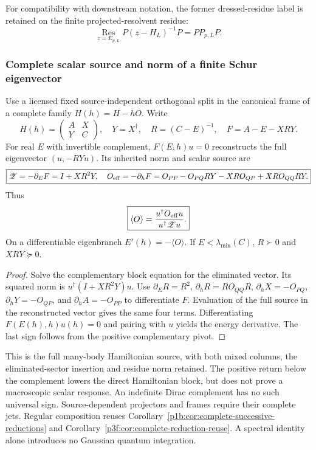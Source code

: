 \documentclass[12pt,a4paper]{article}
\begin{document}
For compatibility with downstream notation, the former dressed-residue label
is retained on the finite projected-resolvent residue:
\begin{equation}
\label{p10:eq:schur-dressed-residue-normalization}
\operatorname*{Res}_{z=E_{p,L}}
P(z-H_L)^{-1}P=P P_{p,L}P .
\end{equation}



\subsubsection{Complete scalar source and norm of a finite Schur eigenvector}
\label{p10:sec:complete-schur-scalar-source}
\begin{theorem}
\label{p10:thm:complete-schur-scalar-source}
Use a licensed fixed source-independent orthogonal split in the
canonical frame of a complete family $H(h)=H-hO$. Write
\[
 H(h)=\begin{pmatrix}A&X\\Y&C\end{pmatrix},\quad Y=X^\dagger,\quad
 R=(C-E)^{-1},\quad F=A-E-XRY.
\]
For real $E$ with invertible complement, $F(E,h)u=0$ reconstructs
the full eigenvector $(u,-RYu)$. Its inherited norm and scalar source are
\[
 \boxed{\mathscr Z=-\partial_EF=I+XR^2Y,\quad
 O_{\rm eff}=-\partial_hF
 =O_{PP}-O_{PQ}RY-XRO_{QP}+XRO_{QQ}RY.}
\]
Thus
\[
 \boxed{\langle O\rangle
 =\frac{u^\dagger O_{\rm eff}u}{u^\dagger\mathscr Zu}.}
\]
On a differentiable eigenbranch $E'(h)=-\langle O\rangle$.
If $E<\lambda_{\min}(C)$, $R\succ0$ and $XRY\succeq0$.
\end{theorem}
\begin{proof}
Solve the complementary block equation for the eliminated vector.
Its squared norm is $u^\dagger(I+XR^2Y)u$.
Use $\partial_ER=R^2$, $\partial_hR=RO_{QQ}R$,
$\partial_hX=-O_{PQ}$, $\partial_hY=-O_{QP}$, and
$\partial_hA=-O_{PP}$ to differentiate $F$.
Evaluation of the full source in the reconstructed vector gives
the same four terms. Differentiating $F(E(h),h)u(h)=0$ and
pairing with $u$ yields the energy derivative.
The last sign follows from the positive complementary pivot.
\end{proof}
This is the full many-body Hamiltonian source, with both mixed columns,
the eliminated-sector insertion and residue norm retained. The
positive return below the complement lowers the direct Hamiltonian
block, but does not prove a macroscopic scalar response. An indefinite
Dirac complement has no such universal sign.
Source-dependent projectors and frames require their complete jets.
Regular composition reuses Corollary~\ref{p1b:cor:complete-successive-reductions}
and Corollary~\ref{p3f:cor:complete-reduction-reuse}.
A spectral identity alone introduces no Gaussian quantum integration.
\end{document}
